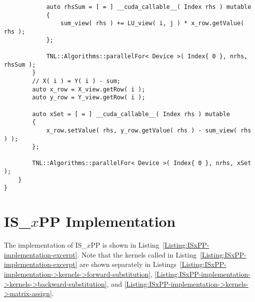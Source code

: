 \begin{lstlisting}
			auto rhsSum = [ = ] __cuda_callable__( Index rhs ) mutable
			{
				sum_view( rhs ) += LU_view( i, j ) * x_row.getValue( rhs );
			};
			
			TNL::Algorithms::parallelFor< Device >( Index{ 0 }, nrhs, rhsSum );
		}
		// X( i ) = Y( i ) - sum;		
		auto x_row = X_view.getRow( i );
		auto y_row = Y_view.getRow( i );
		
		auto xSet = [ = ] __cuda_callable__( Index rhs ) mutable
		{
			x_row.setValue( rhs, y_row.getValue( rhs ) - sum_view( rhs ) );
		};
		
		TNL::Algorithms::parallelFor< Device >( Index{ 0 }, nrhs, xSet );
	}
}
\end{lstlisting}




\chapter{IS\_$x$PP Implementation}\label{Appendix:ISxPP-implementation}
The implementation of IS\_$x$PP is shown in Listing~\ref{Listing:ISxPP-implementation-excerpt}.
Note that the kernels called in Listing~\ref{Listing:ISxPP-implementation-excerpt} are shown separately in Listings~\ref{Listing:ISxPP-implementation->kernels->forward-substitution}, \ref{Listing:ISxPP-implementation->kernels->backward-substitution}, and \ref{Listing:ISxPP-implementation->kernels->matrix-assign}.

